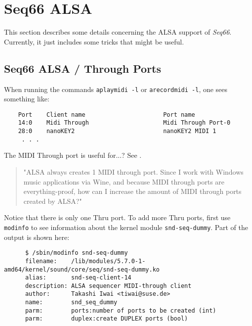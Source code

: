 %
%
%

\section{Seq66 ALSA}
\label{sec:alsa}

   This section describes some details concerning the ALSA support of
   \textsl{Seq66}.
   Currently, it just includes some tricks that might be useful.

\subsection{Seq66 ALSA / Through Ports}
\label{subsec:alsa_through_ports}

   When running the commands \texttt{aplaymidi -l} or \texttt{arecordmidi -l},
   one sees something like:

   \begin{verbatim}
    Port    Client name                      Port name
    14:0    Midi Through                     Midi Through Port-0
    28:0    nanoKEY2                         nanoKEY2 MIDI 1
     . . .
   \end{verbatim}

   The MIDI Through port is useful for...? See \cite{alsathru}.

   \begin{quote}
   "ALSA always creates 1 MIDI through port. Since I work with Windows music
   applications via Wine, and because MIDI through ports are everything-proof,
   how can I increase the amount of MIDI through ports created by ALSA?"
   \end{quote}

   Notice that there is only one Thru port.
   To add more Thru ports, first use \texttt{modinfo} to see information about
   the kernel module \texttt{snd-seq-dummy}.  Part of the output is shown here:

   \begin{verbatim}
      $ /sbin/modinfo snd-seq-dummy
      filename:    /lib/modules/5.7.0-1-amd64/kernel/sound/core/seq/snd-seq-dummy.ko
      alias:       snd-seq-client-14
      description: ALSA sequencer MIDI-through client
      author:      Takashi Iwai <tiwai@suse.de>
      name:        snd_seq_dummy
      parm:        ports:number of ports to be created (int)
      parm:        duplex:create DUPLEX ports (bool)
   \end{verbatim}

